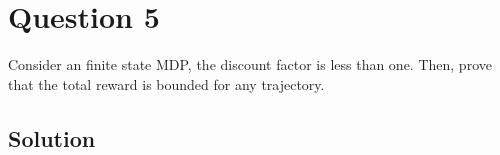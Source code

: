 \section*{Question 5}

Consider an finite state MDP, the discount factor is less than one.
Then, prove that the total reward is bounded for any trajectory.

\subsection*{Solution}
